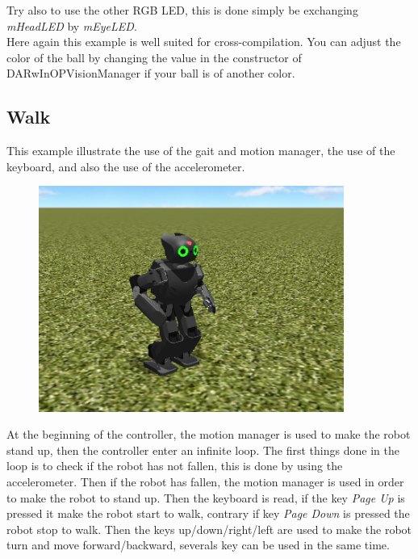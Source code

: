 \documentclass[a4paper, 12pt]{article}  		%
\begin{document}
Try also to use the other RGB LED, this is done simply be exchanging \textit{mHeadLED} by \textit{mEyeLED}.\\

Here again this example is well suited for cross-compilation. You can adjust the color of the ball by changing the value in the constructor of DARwInOPVisionManager if your ball is of another color.\\


\newpage
\subsection{Walk}

This example illustrate the use of the gait and motion manager, the use of the keyboard, and also the use of the accelerometer.\\

\begin{figure}[H]
\begin{center}
\includegraphics[width=10cm]{example_walk.png}
\label{example_walk.png}
\end{center}
\end{figure}

At the beginning of the controller, the motion manager is used to make the robot stand up, then the controller enter an infinite loop.
The first things done in the loop is to check if the robot has not fallen, this is done by using the accelerometer. Then if the robot has fallen, the motion manager is used in order to make the robot to stand up. 
Then the keyboard is read, if the key \textit{Page Up} is pressed it make the robot start to walk, contrary if key \textit{Page Down} is pressed the robot stop to walk.
Then the keys up/down/right/left are used to make the robot turn and move forward/backward, severals key can be used in the same time.\\
\end{document}
